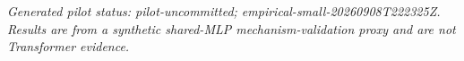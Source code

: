 \noindent\textit{Generated pilot status: pilot-uncommitted; empirical-small-20260908T222325Z. Results are from a synthetic shared-MLP mechanism-validation proxy and are not Transformer evidence.}\par
